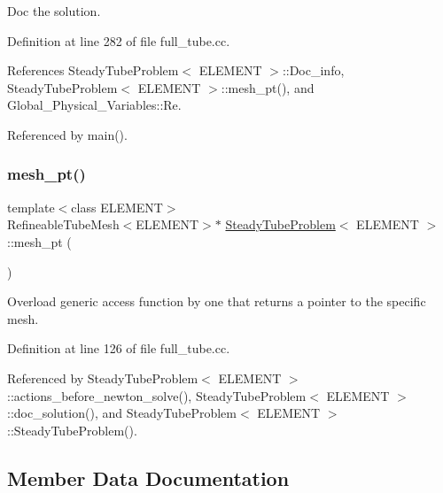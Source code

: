 Doc the solution. 



Definition at line 282 of file full\+\_\+tube.\+cc.



References Steady\+Tube\+Problem$<$ E\+L\+E\+M\+E\+N\+T $>$\+::\+Doc\+\_\+info, Steady\+Tube\+Problem$<$ E\+L\+E\+M\+E\+N\+T $>$\+::mesh\+\_\+pt(), and Global\+\_\+\+Physical\+\_\+\+Variables\+::\+Re.



Referenced by main().

\mbox{\label{classSteadyTubeProblem_ac2f2254773b6e20c58a104f9a12efba8}} 
\subsubsection{\texorpdfstring{mesh\+\_\+pt()}{mesh\_pt()}}
{\footnotesize\ttfamily template$<$class E\+L\+E\+M\+E\+NT$>$ \\
Refineable\+Tube\+Mesh$<$E\+L\+E\+M\+E\+NT$>$$\ast$ \hyperlink{classSteadyTubeProblem}{Steady\+Tube\+Problem}$<$ E\+L\+E\+M\+E\+NT $>$\+::mesh\+\_\+pt (\begin{DoxyParamCaption}{ }\end{DoxyParamCaption})\hspace{0.3cm}{\ttfamily [inline]}}



Overload generic access function by one that returns a pointer to the specific mesh. 



Definition at line 126 of file full\+\_\+tube.\+cc.



Referenced by Steady\+Tube\+Problem$<$ E\+L\+E\+M\+E\+N\+T $>$\+::actions\+\_\+before\+\_\+newton\+\_\+solve(), Steady\+Tube\+Problem$<$ E\+L\+E\+M\+E\+N\+T $>$\+::doc\+\_\+solution(), and Steady\+Tube\+Problem$<$ E\+L\+E\+M\+E\+N\+T $>$\+::\+Steady\+Tube\+Problem().



\subsection{Member Data Documentation}
\mbox{\label{classSteadyTubeProblem_a2d535b7b21eb6383b9f3c9f4c3ce4510}} 
